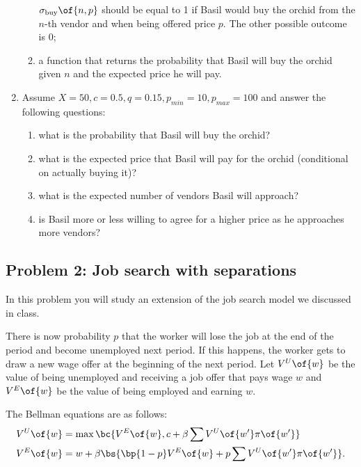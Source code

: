 \documentclass[english,hyperref={pdftex,pdfpagemode=UseNone,hidelinks}]{tufte-handout}
\begin{document}
\begin{enumerate}
\begin{enumerate}
    $\sigma_{\text{buy}}\of{n,p}$ should be equal to 1 if Basil would buy the orchid from the $n$-th vendor and when being offered price $p$. The other possible outcome is 0;
    
    \item a function that returns the probability that Basil will buy the orchid given $n$ and the expected price he will pay. 

\end{enumerate}
    
\item Assume $X = 50, c = 0.5, q = 0.15, p_{min} = 10, p_{max} = 100$ and answer the following questions: 
\begin{enumerate}
\item what is the probability that Basil will buy the orchid?
\item what is the expected price that Basil will pay for the orchid (conditional on actually buying it)? 
\item what is the expected number of vendors Basil will approach?
\item is Basil more or less willing to agree for a higher price as he approaches more vendors?
\end{enumerate}
\end{enumerate}

\subsection*{Problem 2: Job search with separations}

In this problem you will study an extension of the job search model we discussed in class. 

There is now probability $p$ that the worker will lose the job at the end of the period and become unemployed next period. If this happens, the worker gets to draw a new wage offer at the beginning of the next period. Let $V^U\of{w}$ be the value of being unemployed and receiving a job offer that pays wage $w$ and $V^E\of{w}$ be the value of being employed and earning $w$.

The Bellman equations are as follows:
\begin{align*} 
V^U\of{w} & = \max\bc{V^E\of{w}, c + \beta \sum V^U\of{w'} \pi\of{w'}} \\
V^E\of{w} & = w + \beta \bs{\bp{1-p} V^E\of{w} + p \sum V^U\of{w'} \pi\of{w'}}.
\end{align*}
\end{document}
